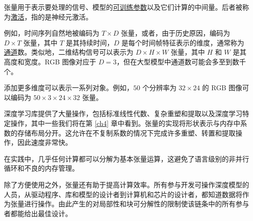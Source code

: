 张量用于表示要处理的信号、模型的\underline{可训练参数}以及它们计算的中间量。后者被称为\underline{激活}，指的是神经元激活。

例如，时间序列自然地被编码为 $T \times D$ 张量，或者，由于历史原因，编码为 $D \times T$ 张量，其中 $T$ 是其持续时间，$D$ 是每个时间帧特征表示的维度，通常称为\underline{通道}数。类似地，二维结构信号可以表示为 $D \times H \times W$ 张量，其中 $H$ 和 $W$ 是其高度和宽度。RGB 图像对应于 $D = 3$，但在大型模型中通道数可能会多至到数千个。

添加更多维度可以表示一系列对象。例如，$50$ 个分辨率为 $32 \times 24$ 的 RGB 图像可以编码为 $50 \times 3 \times 24 \times 32$ 张量。

深度学习库提供了大量操作，包括标准线性代数、复杂重塑和提取以及深度学习特定操作，其中一些我们将在第 \ref{ch4} 章中看到。张量的实现将形状表示与内存中系数的存储布局分开。这允许在不复制系数的情况下完成许多重塑、转置和提取操作，因此速度非常快。

在实践中，几乎任何计算都可以分解为基本张量运算，这避免了语言级别的非并行循环和不良的内存管理。

除了方便使用之外，张量还有助于提高计算效率。所有参与开发可操作深度模型的人员，从驱动程序、库和模型的设计者到计算机和芯片的设计者，都知道数据将作为张量进行操作。由此产生的对局部性和块可分解性的限制使该链条中的所有参与者都能给出最佳设计。